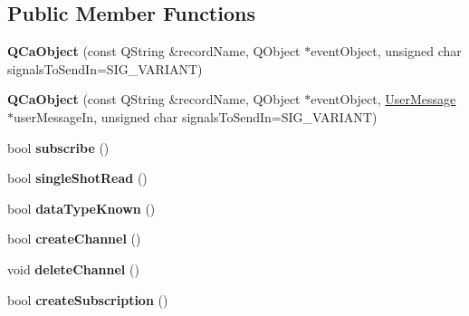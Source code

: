 \subsection*{Public Member Functions}
\begin{DoxyCompactItemize}
\item 
\hypertarget{classqcaobject_1_1QCaObject_a6badf3b34fd50ce6f338bc5b735a6d48}{
{\bfseries QCaObject} (const QString \&recordName, QObject $\ast$eventObject, unsigned char signalsToSendIn=SIG\_\-VARIANT)}
\label{classqcaobject_1_1QCaObject_a6badf3b34fd50ce6f338bc5b735a6d48}

\item 
\hypertarget{classqcaobject_1_1QCaObject_ab17589a7ceb16ef1b22628ab5ee8108f}{
{\bfseries QCaObject} (const QString \&recordName, QObject $\ast$eventObject, \hyperlink{classUserMessage}{UserMessage} $\ast$userMessageIn, unsigned char signalsToSendIn=SIG\_\-VARIANT)}
\label{classqcaobject_1_1QCaObject_ab17589a7ceb16ef1b22628ab5ee8108f}

\item 
\hypertarget{classqcaobject_1_1QCaObject_adea4901780b3d5bbe4345742064008bc}{
bool {\bfseries subscribe} ()}
\label{classqcaobject_1_1QCaObject_adea4901780b3d5bbe4345742064008bc}

\item 
\hypertarget{classqcaobject_1_1QCaObject_a675959d11d17faa38da90e11e5324134}{
bool {\bfseries singleShotRead} ()}
\label{classqcaobject_1_1QCaObject_a675959d11d17faa38da90e11e5324134}

\item 
\hypertarget{classqcaobject_1_1QCaObject_addc9c322e685dbb3526498c2c178007f}{
bool {\bfseries dataTypeKnown} ()}
\label{classqcaobject_1_1QCaObject_addc9c322e685dbb3526498c2c178007f}

\item 
\hypertarget{classqcaobject_1_1QCaObject_a53e9ca2cf18fd5d6fa1cc30158551181}{
bool {\bfseries createChannel} ()}
\label{classqcaobject_1_1QCaObject_a53e9ca2cf18fd5d6fa1cc30158551181}

\item 
\hypertarget{classqcaobject_1_1QCaObject_a035b09eae7c3f70d261cab992dc6cdbe}{
void {\bfseries deleteChannel} ()}
\label{classqcaobject_1_1QCaObject_a035b09eae7c3f70d261cab992dc6cdbe}

\item 
\hypertarget{classqcaobject_1_1QCaObject_aa4e04ac8780690fdcc022b63cfbe55f5}{
bool {\bfseries createSubscription} ()}
\label{classqcaobject_1_1QCaObject_aa4e04ac8780690fdcc022b63cfbe55f5}


\end{DoxyCompactItemize}

